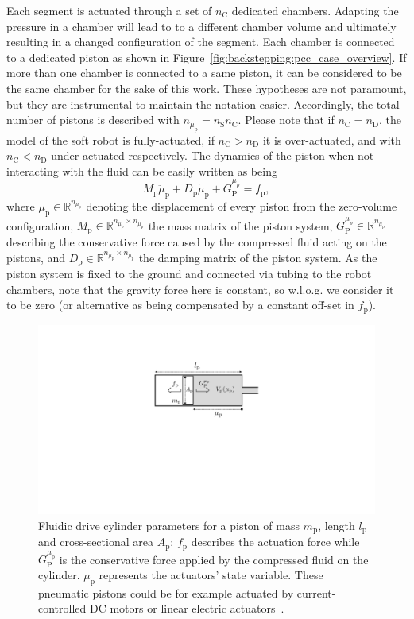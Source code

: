 %
Each segment is actuated through a set of $n_{\mathrm{C}}$ dedicated chambers.
%
Adapting the pressure in a chamber will lead to to a different chamber volume and ultimately resulting in a changed configuration of the segment.
%
Each chamber is connected to a dedicated piston as shown in Figure~\ref{fig:backstepping:pcc_case_overview}. If more than one chamber is connected to a same piston, it can be considered to be the same chamber for the sake of this work.
%
These hypotheses are not paramount, but they are instrumental to maintain the notation easier.
%
Accordingly, the total number of pistons is described with $n_{\mu_\mathrm{p}} = n_{\mathrm{S}} n_{\mathrm{C}}$.
%
Please note that if $n_\mathrm{C} = n_\mathrm{D}$, the model of the soft robot is fully-actuated, if $n_\mathrm{C} > n_\mathrm{D}$ it is over-actuated, and with $n_\mathrm{C} < n_\mathrm{D}$ under-actuated respectively.
%
The dynamics of the piston when not interacting with the fluid can be easily written as being
%
\begin{equation}
M_\mathrm{p} \ddot{\mu}_\mathrm{p} + D_\mathrm{p} \dot{\mu}_\mathrm{p} + G_{\mathrm{P}}^{\mu_p} = f_\mathrm{p},
\end{equation}
%
where $\mu_\mathrm{p} \in \mathbb{R}^{n_{\mu_\mathrm{p}}}$ denoting the displacement of every piston from the zero-volume configuration, $M_\mathrm{p} \in \mathbb{R}^{n_{\mu_\mathrm{p}} \times n_{\mu_\mathrm{p}}}$ the mass matrix of the piston system, $G_{\mathrm{P}}^{\mu_p} \in \mathbb{R}^{n_{\mu_\mathrm{p}}}$ describing the conservative force caused by the compressed fluid acting on the pistons, and $D_\mathrm{p} \in \mathbb{R}^{n_{\mu_\mathrm{p}} \times n_{\mu_\mathrm{p}}}$ the damping matrix of the piston system. 
As the piston system is fixed to the ground and connected via tubing to the robot chambers, note that the gravity force here is constant, so w.l.o.g. we consider it to be zero (or alternative as being compensated by a constant off\--set in $f_\mathrm{p}$).

\begin{figure}[ht]
  \centering
  \includegraphics[width=0.5\columnwidth]{backstepping/figures/backstepping_graphics_fluidic_drive_cylinder_v4.pdf}
  \caption{Fluidic drive cylinder parameters for a piston of mass $m_\mathrm{p}$, length $l_\mathrm{p}$ and cross-sectional area $A_\mathrm{p}$: $f_\mathrm{p}$ describes the actuation force while $G_\mathrm{P}^{\mu_\mathrm{p}}$ is the conservative force applied by the compressed fluid on the cylinder. $\mu_\mathrm{p}$ represents the actuators' state variable. These pneumatic pistons could be for example actuated by current-controlled DC motors or linear electric actuators~\cite{marchese2014design}.}\label{fig:backstepping:fluidic_drive_cylinder}
\end{figure}

